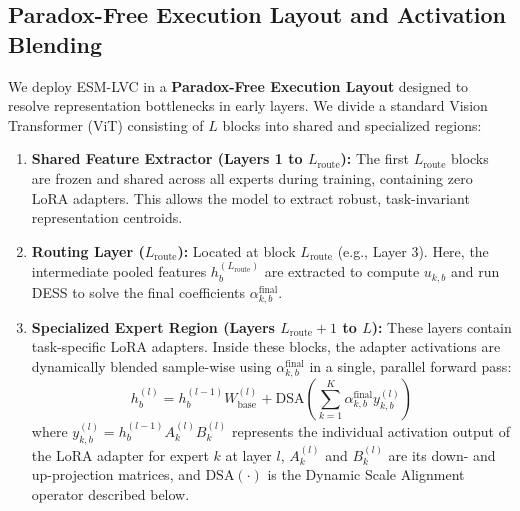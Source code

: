 \subsection{Paradox-Free Execution Layout and Activation Blending}
\label{subsec:architecture}
We deploy ESM-LVC in a \textbf{Paradox-Free Execution Layout} designed to resolve representation bottlenecks in early layers. We divide a standard Vision Transformer (ViT) consisting of $L$ blocks into shared and specialized regions:
\begin{enumerate}
    \item \textbf{Shared Feature Extractor (Layers 1 to $L_{\text{route}}$):} The first $L_{\text{route}}$ blocks are frozen and shared across all experts during training, containing zero LoRA adapters. This allows the model to extract robust, task-invariant representation centroids.
    \item \textbf{Routing Layer ($L_{\text{route}}$):} Located at block $L_{\text{route}}$ (e.g., Layer 3). Here, the intermediate pooled features $h^{(L_{\text{route}})}_b$ are extracted to compute $u_{k, b}$ and run DESS to solve the final coefficients $\alpha^{\text{final}}_{k, b}$.
    \item \textbf{Specialized Expert Region (Layers $L_{\text{route}} + 1$ to $L$):} These layers contain task-specific LoRA adapters. Inside these blocks, the adapter activations are dynamically blended sample-wise using $\alpha^{\text{final}}_{k, b}$ in a single, parallel forward pass:
    \begin{equation}
        h_b^{(l)} = h_b^{(l-1)} W_{\text{base}}^{(l)} + \text{DSA}\left( \sum_{k=1}^K \alpha^{\text{final}}_{k, b} y_{k, b}^{(l)} \right)
    \end{equation}
    where $y_{k, b}^{(l)} = h_b^{(l-1)} A_k^{(l)} B_k^{(l)}$ represents the individual activation output of the LoRA adapter for expert $k$ at layer $l$, $A_k^{(l)}$ and $B_k^{(l)}$ are its down- and up-projection matrices, and $\text{DSA}(\cdot)$ is the Dynamic Scale Alignment operator described below.
\end{enumerate}

